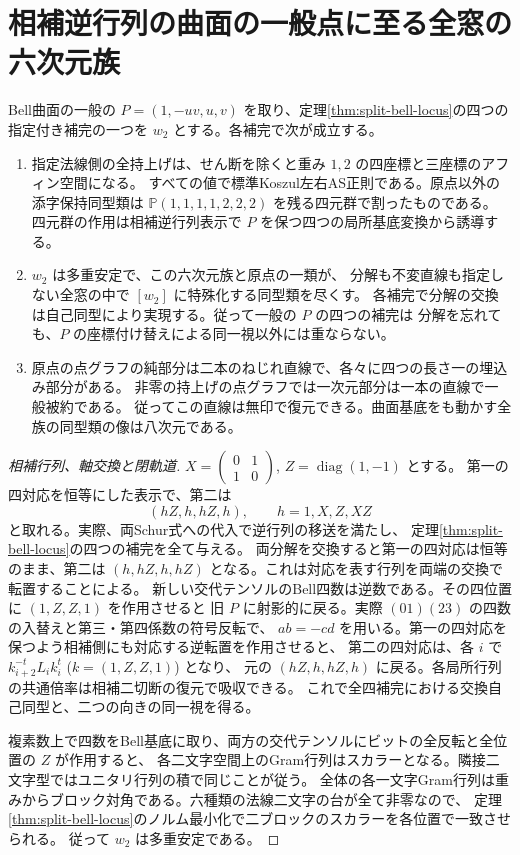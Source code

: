 \section{相補逆行列の曲面の一般点に至る全窓の六次元族}
\label{sec:split-surface-full-fibers}
\begin{theorem}\label{thm:split-surface-full-fibers}
Bell曲面の一般の $P=(1,-uv,u,v)$ を取り、定理\ref{thm:split-bell-locus}の四つの
指定付き補完の一つを $w_2$ とする。各補完で次が成立する。
\begin{enumerate}
\item 指定法線側の全持上げは、せん断を除くと重み $1,2$ の四座標と三座標のアフィン空間になる。
すべての値で標準Koszul左右AS正則である。原点以外の添字保持同型類は
$\mathbb P(1,1,1,1,2,2,2)$ を残る四元群で割ったものである。
四元群の作用は相補逆行列表示で $P$ を保つ四つの局所基底変換から誘導する。
\item $w_2$ は多重安定で、この六次元族と原点の一類が、
分解も不変直線も指定しない全窓の中で $[w_2]$ に特殊化する同型類を尽くす。
各補完で分解の交換は自己同型により実現する。従って一般の $P$ の四つの補完は
分解を忘れても、$P$ の座標付け替えによる同一視以外には重ならない。
\item 原点の点グラフの純部分は二本のねじれ直線で、各々に四つの長さ一の埋込み部分がある。
非零の持上げの点グラフでは一次元部分は一本の直線で一般被約である。
従ってこの直線は無印で復元できる。曲面基底をも動かす全族の同型類の像は八次元である。
\end{enumerate}
\end{theorem}
\begin{proof}[相補行列、軸交換と閉軌道]
$X=\left(\begin{smallmatrix}0&1\\1&0\end{smallmatrix}\right)$, $Z=\operatorname{diag}(1,-1)$ とする。
第一の四対応を恒等にした表示で、第二は
\[
                  (hZ,h,hZ,h),\qquad h=1,X,Z,XZ
\]
と取れる。実際、両Schur式への代入で逆行列の移送を満たし、
定理\ref{thm:split-bell-locus}の四つの補完を全て与える。
両分解を交換すると第一の四対応は恒等のまま、第二は
$(h,hZ,h,hZ)$ となる。これは対応を表す行列を両端の交換で転置することによる。
新しい交代テンソルのBell四数は逆数である。その四位置に $(1,Z,Z,1)$ を作用させると
旧 $P$ に射影的に戻る。実際 $(01)(23)$ の四数の入替えと第三・第四係数の符号反転で、
$a b=-c d$ を用いる。第一の四対応を保つよう相補側にも対応する逆転置を作用させると、
第二の四対応は、各 $i$ で $k_{i+2}^{-t} L_i k_i^t$ ($k=(1,Z,Z,1)$) となり、
元の $(hZ,h,hZ,h)$ に戻る。各局所行列の共通倍率は相補二切断の復元で吸収できる。
これで全四補完における交換自己同型と、二つの向きの同一視を得る。

複素数上で四数をBell基底に取り、両方の交代テンソルにビットの全反転と全位置の $Z$ が作用すると、
各二文字空間上のGram行列はスカラーとなる。隣接二文字型ではユニタリ行列の積で同じことが従う。
全体の各一文字Gram行列は重みからブロック対角である。六種類の法線二文字の台が全て非零なので、
定理\ref{thm:split-bell-locus}のノルム最小化で二ブロックのスカラーを各位置で一致させられる。
従って $w_2$ は多重安定である。
\end{proof}
